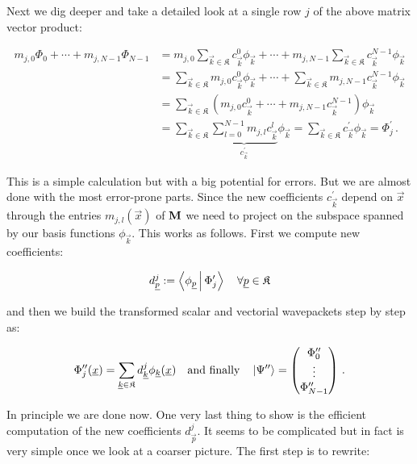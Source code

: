 Next we dig deeper and take a detailed look at a single row $j$ of the above matrix
vector product:

\begin{align*}
  m_{j,0} \Phi_0 + \cdots + m_{j,N-1} \Phi_{N-1} & =
  m_{j,0} \sum_{\vec{k}\in\mathfrak{K}} c_{\vec{k}}^0 \phi_{\vec{k}} + \cdots
  + m_{j,N-1} \sum_{\vec{k}\in\mathfrak{K}} c_{\vec{k}}^{N-1} \phi_{\vec{k}} \\
  & =
  \sum_{\vec{k}\in\mathfrak{K}} m_{j,0}  c_{\vec{k}}^0 \phi_{\vec{k}} + \cdots
  + \sum_{\vec{k}\in\mathfrak{K}} m_{j,N-1} c_{\vec{k}}^{N-1} \phi_{\vec{k}} \\
  & =
  \sum_{\vec{k}\in\mathfrak{K}} \left( m_{j,0}  c_{\vec{k}}^0 + \cdots + m_{j,N-1}  c_{\vec{k}}^{N-1} \right) \phi_{\vec{k}} \\
  & =
  \sum_{\vec{k}\in\mathfrak{K}} \underbrace{\sum_{l=0}^{N-1} m_{j,l}  c_{\vec{k}}^l }_{c_{\vec{k}}^\prime} \phi_{\vec{k}}
  = \sum_{\vec{k}\in\mathfrak{K}} c_{\vec{k}}^\prime \phi_{\vec{k}} = \Phi_{j}^\prime \,.
\end{align*}

This is a simple calculation but with a big potential for errors. But we are almost
done with the most error-prone parts. Since the new coefficients $c_{\vec{k}}^\prime$
depend on $\vec{x}$ through the entries $m_{j,l}(\vec{x})$ of $\mat{M}$ we need
to project on the subspace spanned by our basis functions $\phi_{\vec{k}}$.
This works as follows. First we compute new coefficients:

\begin{equation*}
  d_{\vec{p}}^j \assign \Braket{ \phi_{\vec{p}} | \Phi_{j}^\prime} \quad \forall \vec{p} \in \mathfrak{K}
\end{equation*}

and then we build the transformed scalar and vectorial wavepackets step by step as:

\begin{equation*}
  \Phi_j^{\prime\prime}(\vec{x}) = \sum_{\vec{k}\in\mathfrak{K}} d_{\vec{k}}^j \phi_{\vec{k}}(\vec{x})
  \quad\text{and finally}\quad
  \Ket{\Psi^{\prime\prime}} =
  \begin{pmatrix}
    \Phi_0^{\prime\prime} \\
    \vdots \\
    \Phi_{N-1}^{\prime\prime}
  \end{pmatrix} \,.
\end{equation*}

In principle we are done now. One very last thing to show is the efficient
computation of the new coefficients $d_{\vec{p}}^j$. It seems to be complicated
but in fact is very simple once we look at a coarser picture. The first step
is to rewrite:

